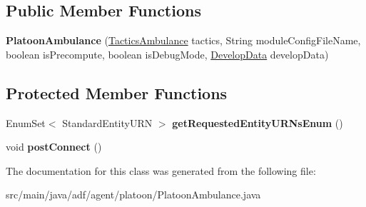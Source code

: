 \subsection*{Public Member Functions}
\begin{DoxyCompactItemize}
\item 
\hypertarget{classadf_1_1agent_1_1platoon_1_1PlatoonAmbulance_a499d8bc5703bbbb0f5b3c853e07a7b15}{}\label{classadf_1_1agent_1_1platoon_1_1PlatoonAmbulance_a499d8bc5703bbbb0f5b3c853e07a7b15} 
{\bfseries Platoon\+Ambulance} (\hyperlink{classadf_1_1component_1_1tactics_1_1TacticsAmbulance}{Tactics\+Ambulance} tactics, String module\+Config\+File\+Name, boolean is\+Precompute, boolean is\+Debug\+Mode, \hyperlink{classadf_1_1agent_1_1develop_1_1DevelopData}{Develop\+Data} develop\+Data)
\end{DoxyCompactItemize}
\subsection*{Protected Member Functions}
\begin{DoxyCompactItemize}
\item 
\hypertarget{classadf_1_1agent_1_1platoon_1_1PlatoonAmbulance_af335b4d2802125b7ea425465b553368c}{}\label{classadf_1_1agent_1_1platoon_1_1PlatoonAmbulance_af335b4d2802125b7ea425465b553368c} 
Enum\+Set$<$ Standard\+Entity\+U\+RN $>$ {\bfseries get\+Requested\+Entity\+U\+R\+Ns\+Enum} ()
\item 
\hypertarget{classadf_1_1agent_1_1platoon_1_1PlatoonAmbulance_a68c9e9c3987f60dc81a5515fc4d77684}{}\label{classadf_1_1agent_1_1platoon_1_1PlatoonAmbulance_a68c9e9c3987f60dc81a5515fc4d77684} 
void {\bfseries post\+Connect} ()
\end{DoxyCompactItemize}


The documentation for this class was generated from the following file\+:\begin{DoxyCompactItemize}
\item 
src/main/java/adf/agent/platoon/Platoon\+Ambulance.\+java\end{DoxyCompactItemize}
